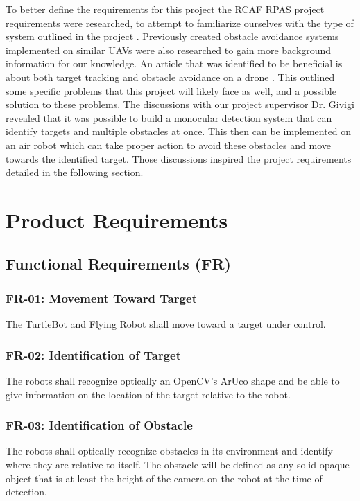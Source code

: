 \documentclass{article}
\begin{document}
	To better define the requirements for this project the RCAF RPAS project requirements were researched, to attempt to familiarize ourselves with the type of system outlined in the project \cite{RPAS}. Previously created obstacle avoidance systems implemented on similar UAVs were also researched to gain more background information for our knowledge. An article that was identified to be beneficial is about both target tracking and obstacle avoidance on a drone \cite{woods2015dynamic}. This outlined some specific problems that this project will likely face as well, and a possible solution to these problems. 
	The discussions with our project supervisor Dr. Givigi revealed that it was possible to build a monocular detection system that can identify targets and multiple obstacles at once. This then can be implemented on an air robot which can take proper action to avoid these obstacles and move towards the identified target. Those discussions inspired the project requirements detailed in the following section.

\section{Product Requirements}

	\subsection{Functional Requirements (FR)}
		
		\subsubsection{FR-01: Movement Toward Target}
		The TurtleBot and Flying Robot shall move toward a target under control.
		
		\subsubsection{FR-02: Identification of Target}
		The robots shall recognize optically an OpenCV's ArUco shape and be able to give information on the location of the target relative to the robot. 

		\subsubsection{FR-03: Identification of Obstacle}
		The robots shall optically recognize obstacles in its environment and identify where they are relative to itself. The obstacle will be defined as any solid opaque object that is at least the height of the camera on the robot at the time of detection.
		
\end{document}
